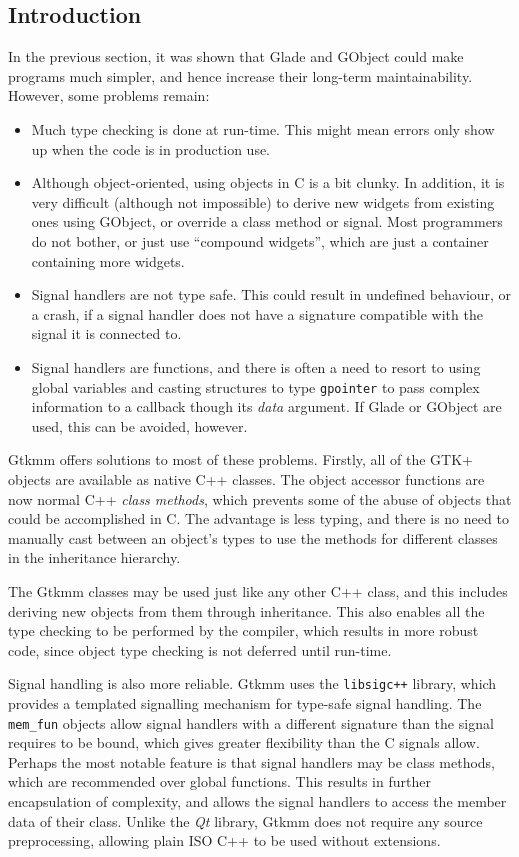 \documentclass[a4paper,oneside]{article}
\newcommand{\program}[1]{\texttt{#1}}
\newcommand{\variable}[1]{\textsl{#1}}
\newcommand{\class}[1]{\texttt{#1}}
\newcommand{\type}[1]{\texttt{#1}}
\begin{document}
\subsection{Introduction}

In the previous section, it was shown that Glade and GObject could
make programs much simpler, and hence increase their long-term
maintainability.  However, some problems remain:

\begin{itemize}
\item Much type checking is done at run-time.  This might mean errors
  only show up when the code is in production use.
\item Although object-oriented, using objects in C is a bit clunky.
  In addition, it is very difficult (although not impossible) to
  derive new widgets from existing ones using GObject, or override a
  class method or signal.  Most programmers do not bother, or just use
  ``compound widgets'', which are just a container containing more
  widgets.
\item Signal handlers are not type safe.  This could result in
  undefined behaviour, or a crash, if a signal handler does not have a
  signature compatible with the signal it is connected to.
\item Signal handlers are functions, and there is often a need to
  resort to using global variables and casting structures to type
  \type{gpointer} to pass complex information to a callback though its
  \variable{data} argument.  If Glade or GObject are used, this can be
  avoided, however.
\end{itemize}

Gtkmm offers solutions to most of these problems.  Firstly, all of the
GTK+ objects are available as native C++ classes.  The object accessor
functions are now normal C++ \emph{class methods}, which prevents some
of the abuse of objects that could be accomplished in C.  The
advantage is less typing, and there is no need to manually cast
between an object's types to use the methods for different classes in
the inheritance hierarchy.

The Gtkmm classes may be used just like any other C++ class, and this
includes deriving new objects from them through inheritance.  This
also enables all the type checking to be performed by the compiler,
which results in more robust code, since object type checking is not
deferred until run-time.

Signal handling is also more reliable.  Gtkmm uses the
\program{libsigc++} library, which provides a templated signalling
mechanism for type-safe signal handling.  The \class{mem\_fun} objects
allow signal handlers with a different signature than the signal
requires to be bound, which gives greater flexibility than the C
signals allow.  Perhaps the most notable feature is that signal
handlers may be class methods, which are recommended over global
functions.  This results in further encapsulation of complexity, and
allows the signal handlers to access the member data of their class.
Unlike the \emph{Qt} library, Gtkmm does not require any source
preprocessing, allowing plain ISO C++ to be used without extensions.
\end{document}
